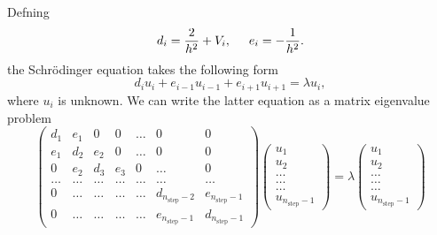 \documentclass[11pt,a4paper,english]{article}
\numberwithin{equation}{section}
\begin{document}
Defning 
\[
   d_i=\frac{2}{h^2}+V_i, \hspace{0.5cm } e_i=-\frac{1}{h^2}.
\]
the Schr\"odinger equation takes the following form
\[
d_iu_i+e_{i-1}u_{i-1}+e_{i+1}u_{i+1}  = \lambda u_i,
\]
where $u_i$ is unknown. We can write the 
latter equation as a matrix eigenvalue problem 
\begin{equation}
    \left( \begin{array}{ccccccc} d_1 & e_1 & 0   & 0    & \dots  &0     & 0 \\
                                e_1 & d_2 & e_2 & 0    & \dots  &0     &0 \\
                                0   & e_2 & d_3 & e_3  &0       &\dots & 0\\
                                \dots  & \dots & \dots & \dots  &\dots      &\dots & \dots\\
                                0   & \dots & \dots & \dots  &\dots       &d_{n_{\mathrm{step}}-2} & e_{n_{\mathrm{step}}-1}\\
                                0   & \dots & \dots & \dots  &\dots       &e_{n_{\mathrm{step}}-1} & d_{n_{\mathrm{step}}-1}

             \end{array} \right)      \left( \begin{array}{c} u_{1} \\
                                                              u_{2} \\
                                                              \dots\\ \dots\\ \dots\\
                                                              u_{n_{\mathrm{step}}-1}
             \end{array} \right)=\lambda \left( \begin{array}{c} u_{1} \\
                                                              u_{2} \\
                                                              \dots\\ \dots\\ \dots\\
                                                              u_{n_{\mathrm{step}}-1}
             \end{array} \right) 
      \label{eq:sematrix}
\end{equation} 
\end{document}
